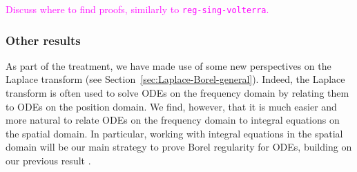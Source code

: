 \documentclass{article}
\theoremstyle{definition}
\newtheorem{remark}[definition]{Remark}
\theoremstyle{plain}
\begin{document}
\textcolor{magenta}{Discuss where to find proofs, similarly to \texttt{reg-sing-volterra}.}
\color{black}
%     
\subsubsection{Other results}
%
As part of the treatment, we have made use of some new perspectives on the Laplace transform (see Section~\ref{sec:Laplace-Borel-general}). Indeed, the Laplace transform is often used to solve ODEs on the frequency domain by relating them to ODEs on the position domain. We find, however, that it is much easier and more natural to relate ODEs on the frequency domain to integral equations on the spatial domain. In particular, working with integral equations in the spatial domain will be our main strategy to prove Borel regularity for ODEs, building on our previous result \cite[Theorem 4]{reg-sing-volterra}. 
\end{document}
